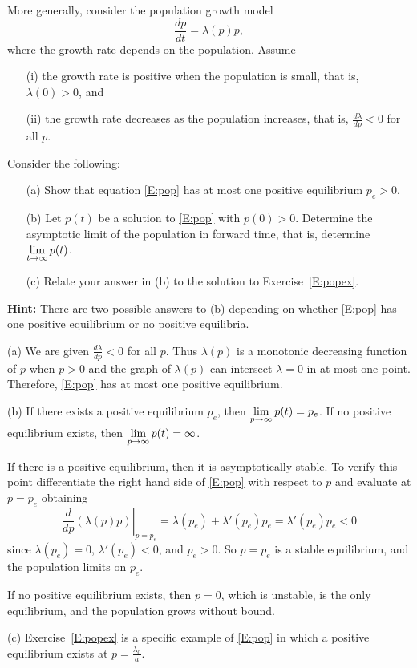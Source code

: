 \documentclass{ximera}
\begin{document}
\begin{exercise} \label{c8.2.3}
More generally, consider the population growth model
\begin{equation} \label{E:pop}
\frac{dp}{dt} = \lambda(p) p, 
\end{equation}
where the growth rate depends on the population.  Assume
\begin{enumerate}
\item[(i)] the growth rate is positive when the population is 
small, that is, $\lambda(0)>0$, and 
\item[(ii)] the growth rate decreases as the population
increases, that is, $\frac{d\lambda}{dp} < 0$ for all $p$.
\end{enumerate}
Consider the following:
\begin{enumerate}
\item[(a)] Show that equation \eqref{E:pop} has at most one
positive equilibrium $p_e>0$.
\item[(b)] Let $p(t)$ be a solution to \eqref{E:pop} with
$p(0)>0$. Determine the asymptotic limit of the population in
forward time, that is, determine $\displaystyle\lim_{t\to\infty} p(t)$. 
\item[(c)] Relate your answer in (b) to the solution to
Exercise~\ref{E:popex}. 
\end{enumerate}
{\bf Hint:} There are two possible answers to (b) depending on
whether \eqref{E:pop} has one positive equilibrium or no positive 
equilibria.

\begin{solution}

(a) We are given $\frac{d\lambda}{dp} < 0$ for all $p$.  Thus $\lambda(p)$ is a 
monotonic decreasing function of $p$ when $p>0$ and the graph of 
$\lambda(p)$ can intersect $\lambda=0$ in at most one point.
Therefore, \eqref{E:pop} has at most one positive equilibrium.

(b) \ans If there exists a positive equilibrium $p_e$, then
$\displaystyle\lim_{p \to \infty} p(t) = p_e$.  If no positive equilibrium
exists, then $\displaystyle\lim_{p \to \infty} p(t) = \infty$.

\soln If there is a positive equilibrium, then it is asymptotically stable.
To verify this point differentiate the right hand side of \eqref{E:pop} with respect to 
$p$ and evaluate at $p=p_e$ obtaining
\[
\left.\frac{d}{dp}(\lambda(p)p)\right|_{p=p_e} = 
\lambda(p_e) + \lambda'(p_e)p_e = \lambda'(p_e)p_e <0
\]
since $\lambda(p_e) = 0$, $\lambda'(p_e) < 0$, and $p_e > 0$.  
So $p = p_e$ is a stable equilibrium, and the population limits on
$p_e$.

\para If no positive equilibrium exists, then $p = 0$, which is unstable,
is the only equilibrium, and the population grows without bound.

(c) Exercise~\ref{E:popex} is a specific example of \eqref{E:pop} in
which a positive equilibrium exists at $p = \frac{\lambda_0}{a}$.

\end{solution}
\end{exercise}
\end{document}
